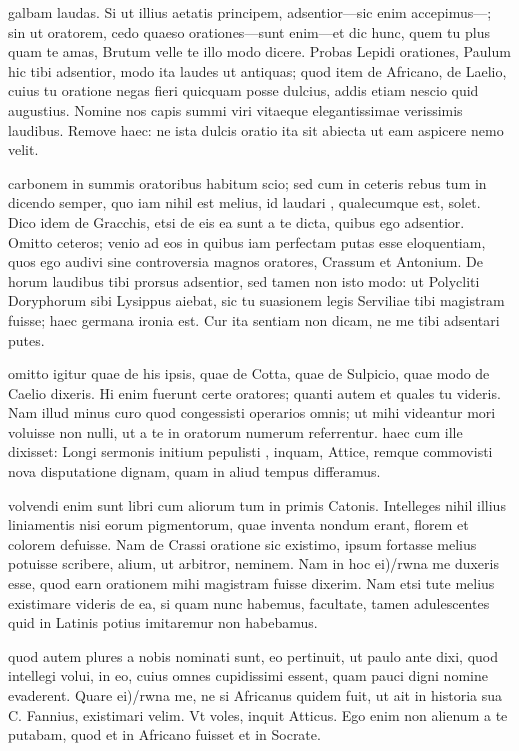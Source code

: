  galbam laudas. Si ut illius aetatis principem, adsentior—sic enim accepimus—; sin ut oratorem, cedo quaeso orationes—sunt enim—et dic hunc, quem tu plus quam te amas, Brutum velle te illo modo dicere. Probas Lepidi orationes, Paulum hic tibi adsentior, modo ita laudes ut antiquas; quod item de Africano, de Laelio, cuius tu oratione negas fieri quicquam posse dulcius, addis etiam nescio quid augustius. Nomine nos capis summi viri vitaeque elegantissimae verissimis laudibus. Remove haec: ne ista dulcis oratio ita sit abiecta ut eam aspicere nemo velit.

 carbonem in summis oratoribus habitum scio; sed cum in ceteris rebus tum in dicendo semper, quo iam nihil est melius, id laudari , qualecumque est, solet. Dico idem de Gracchis, etsi de eis ea sunt a te dicta, quibus ego adsentior. Omitto ceteros; venio ad eos in quibus iam perfectam putas esse eloquentiam, quos ego audivi sine controversia magnos oratores, Crassum et Antonium. De horum laudibus tibi prorsus adsentior, sed tamen non isto modo: ut Polycliti Doryphorum sibi Lysippus aiebat, sic tu suasionem legis Serviliae tibi magistram fuisse; haec germana ironia est. Cur ita sentiam non dicam, ne me tibi adsentari putes.

 omitto igitur quae de his ipsis, quae de Cotta, quae de Sulpicio, quae modo de Caelio dixeris. Hi enim fuerunt certe oratores; quanti autem et quales tu videris. Nam illud minus curo quod congessisti operarios omnis; ut mihi videantur mori voluisse non nulli, ut a te in oratorum numerum referrentur. haec cum ille dixisset: Longi sermonis initium pepulisti , inquam, Attice, remque commovisti nova disputatione dignam, quam in aliud tempus differamus.

 volvendi enim sunt libri cum aliorum tum in primis Catonis. Intelleges nihil illius liniamentis nisi eorum pigmentorum, quae inventa nondum erant, florem et colorem defuisse. Nam de Crassi oratione sic existimo, ipsum fortasse melius potuisse scribere, alium, ut arbitror, neminem. Nam in hoc ei)/rwna me duxeris esse, quod earn orationem mihi magistram fuisse dixerim. Nam etsi tute melius existimare videris de ea, si quam nunc habemus, facultate, tamen adulescentes quid in Latinis potius imitaremur non habebamus.

 quod autem plures a nobis nominati sunt, eo pertinuit, ut paulo ante dixi, quod intellegi volui, in eo, cuius omnes cupidissimi essent, quam pauci digni nomine evaderent. Quare ei)/rwna me, ne si Africanus quidem fuit, ut ait in historia sua C. Fannius, existimari velim. Vt voles, inquit Atticus. Ego enim non alienum a te putabam, quod et in Africano fuisset et in Socrate.

